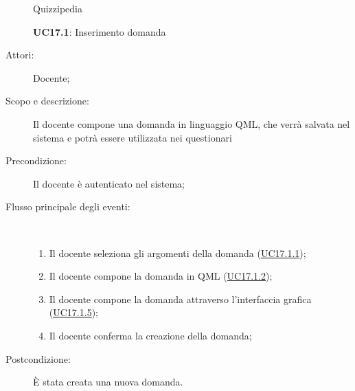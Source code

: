 \begin{figure}[H]
	\centering
	\begin{resizedtikzpicture}{\textwidth}
		\begin{umlsystem}[x=0, fill=lightgray!20]{Quizzipedia}
		\end{umlsystem}
	\end{resizedtikzpicture}
	\caption{\textbf{UC17.1}: Inserimento domanda}
	\label{UC17.1}
\end{figure}
\begin{description}
	\item[Attori:] Docente;
	\item[Scopo e descrizione:] Il docente compone una domanda in linguaggio QML, che verrà salvata nel sistema e potrà essere utilizzata nei questionari
	\item[Precondizione:] Il docente è autenticato nel sistema;
	
	\item[Flusso principale degli eventi:] \ 
	\begin{enumerate}
		\item Il docente seleziona gli argomenti della domanda (\hyperlink{UC17.1.1}{UC17.1.1});
		\item Il docente compone la domanda in QML  (\hyperlink{UC17.1.2}{UC17.1.2});
		\item Il docente compone la domanda attraverso l'interfaccia grafica (\hyperlink{UC17.1.5}{UC17.1.5});
		\item Il docente conferma la creazione della domanda;
		
	\end{enumerate}
	\item[Postcondizione:] È stata creata una nuova domanda.
\end{description}
\hypertarget{UC17.1.1}{}
